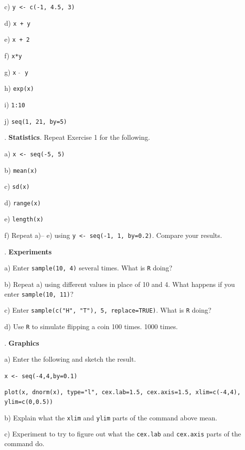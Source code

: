 \documentclass[10pt]{article}
\newcounter{EX}\setcounter{EX}{1}
\newcommand{\EXERCISE}{\arabic{EX}.\stepcounter{EX} }
\begin{document}
\SUBX c) \texttt{y <- c(-1, 4.5, 3)}
\BSK

\SUBX d) \texttt{x + y}
\BSK

\SUBX e) \texttt{x + 2}
\BSK

\SUBX f) \texttt{x*y}
\BSK

\SUBX g) \texttt{x  $\widehat{\hspace{3pt}}$  y}
\BSK

\SUBX h) \texttt{exp(x)}
\BSK

\SUBX i) \texttt{1:10}
\BSK

\SUBX j) \texttt{seq(1, 21, by=5)}
\BSK

\vfill
\eject

\EXERCISE \textbf{Statistics}. Repeat Exercise 1 for the following.

\SUBX a) \texttt{x <- seq(-5, 5)} %
\BSK

\SUBX b) \texttt{mean(x)}
\BSK

\SUBX c) \texttt{sd(x)}
\BSK

\SUBX d) \texttt{range(x)}
\BSK

\SUBX e) \texttt{length(x)}
\BSK

\SUBX f) Repeat a)-- e) using \texttt{y <- seq(-1, 1, by=0.2)}.  
Compare your results.
\vspace{.6in}

\EXERCISE \textbf{Experiments}

\SUBX a) Enter \texttt{sample(10, 4)} several times.  
What is \texttt{R} doing?  
\BSK

\SUBX b) Repeat a) using different values in place of 10 and 4.  What happens
  if you enter \texttt{sample(10, 11)}?
\BSK

\SUBX c) Enter \texttt{sample(c("H", "T"), 5, replace=TRUE)}.
  What is \texttt{R} doing?
\BSK

\SUBX d) Use \texttt{R} to simulate flipping a coin 100 times.  1000 times. 
\bigskip

\EXERCISE \textbf{Graphics}

\SUBX a) Enter the following and sketch the result.

\hspace{20pt} \texttt{x <- seq(-4,4,by=0.1)}

\hspace{20pt} 
\texttt{plot(x, dnorm(x), type="l", cex.lab=1.5, cex.axis=1.5, xlim=c(-4,4), ylim=c(0,0.5))}
\vspace{0.5in}

\SUBX b) Explain what the \texttt{xlim} and \texttt{ylim} parts of the 
  command above mean.
\BSK\BSK

\SUBX c) Experiment to try to figure out what the \texttt{cex.lab}
  and \texttt{cex.axis} parts of the command do.
\vfill
\eject
\end{document}

